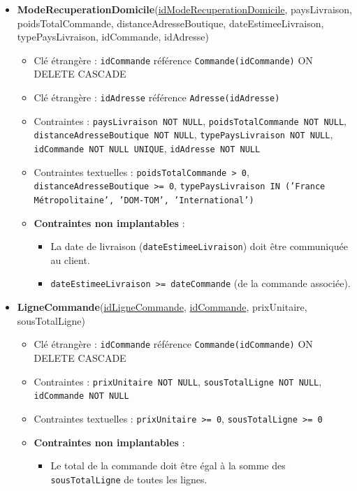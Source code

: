 \begin{itemize}
    \item \textbf{ModeRecuperationDomicile}(\underline{idModeRecuperationDomicile}, paysLivraison, poidsTotalCommande, distanceAdresseBoutique, dateEstimeeLivraison, typePaysLivraison, idCommande, idAdresse)
    \begin{itemize}
        \item Clé étrangère : \texttt{idCommande} référence \texttt{Commande(idCommande)} ON DELETE CASCADE
        \item Clé étrangère : \texttt{idAdresse} référence \texttt{Adresse(idAdresse)}
        \item Contraintes : \texttt{paysLivraison NOT NULL}, \texttt{poidsTotalCommande NOT NULL}, \texttt{distanceAdresseBoutique NOT NULL}, \texttt{typePaysLivraison NOT NULL}, \texttt{idCommande NOT NULL UNIQUE}, \texttt{idAdresse NOT NULL}
        \item Contraintes textuelles : \texttt{poidsTotalCommande > 0}, \texttt{distanceAdresseBoutique >= 0}, \texttt{typePaysLivraison IN ('France Métropolitaine', 'DOM-TOM', 'International')}
        \item \textbf{Contraintes non implantables} :
        \begin{itemize}
            \item La date de livraison (\texttt{dateEstimeeLivraison}) doit être communiquée au client.
            \item \texttt{dateEstimeeLivraison >= dateCommande} (de la commande associée).
        \end{itemize}
    \end{itemize}
    
    \item \textbf{LigneCommande}(\underline{idLigneCommande}, \underline{idCommande}, prixUnitaire, sousTotalLigne)
    \begin{itemize}
        \item Clé étrangère : \texttt{idCommande} référence \texttt{Commande(idCommande)} ON DELETE CASCADE
        \item Contraintes : \texttt{prixUnitaire NOT NULL}, \texttt{sousTotalLigne NOT NULL}, \texttt{idCommande NOT NULL}
        \item Contraintes textuelles : \texttt{prixUnitaire >= 0}, \texttt{sousTotalLigne >= 0}
        \item \textbf{Contraintes non implantables} :
        \begin{itemize}
            \item Le total de la commande doit être égal à la somme des \texttt{sousTotalLigne} de toutes les lignes.
        \end{itemize}
    \end{itemize}
\end{itemize}

